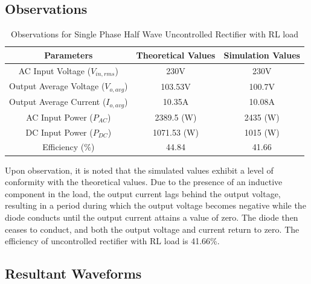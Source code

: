 \subsection{Observations}

\begin{table}[h]
    \renewcommand{\arraystretch}{1.3}
    \label{table_observation_2}
    \centering
    \begin{tabular}{|c|c|c|}
        \hline
        Parameters                              & Theoretical Values & Simulation Values \\
        \hline
        \hline
        AC Input Voltage ($ V_{in,rms} $)       & 230V               & 230V              \\
        \hline
        Output Average Voltage ($ V_{o,avg} $)  & 103.53V            & 100.7V            \\
        \hline
        Output Average Current ($ I_{o,avg}  $) & 10.35A             & 10.08A            \\
        \hline
        AC Input Power ($ P_{AC} $)             & 2389.5 (W)         & 2435 (W)          \\
        \hline
        DC Input Power ($ P_{DC} $)             & 1071.53 (W)        & 1015 (W)          \\
        \hline
        Efficiency (\%)                         & 44.84              & 41.66             \\
        \hline
    \end{tabular}
    \caption{Observations for Single Phase Half Wave Uncontrolled Rectifier with RL load}

\end{table}


Upon observation, it is noted that the simulated values exhibit a level of conformity with the theoretical values. Due to the presence of an inductive component in the load, the output current lags behind the output voltage, resulting in a period during which the output voltage becomes negative while the diode conducts until the output current attains a value of zero. The diode then ceases to conduct, and both the output voltage and current return to zero.
The efficiency of uncontrolled rectifier with RL load is 41.66\%.
\pagebreak


\subsection{Resultant Waveforms}

